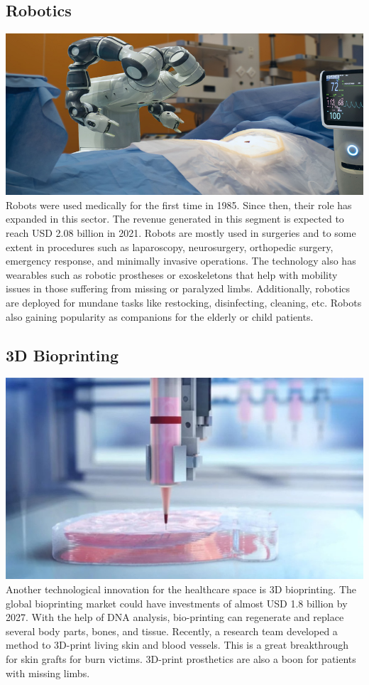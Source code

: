 \documentclass[12pt]{article}
\begin{document}
\subsection*{Robotics}
 \includegraphics[scale=0.2]{rob.jpg}
 \\
Robots were used medically for the first time in 1985. Since then, their role has expanded in this sector. The revenue generated in this segment is expected to reach USD 2.08 billion in 2021. Robots are mostly used in surgeries and to some extent in procedures such as laparoscopy, neurosurgery, orthopedic surgery, emergency response, and minimally invasive operations. The technology also has wearables such as robotic prostheses or exoskeletons that help with mobility issues in those suffering from missing or paralyzed limbs. Additionally, robotics are deployed for mundane tasks like restocking, disinfecting, cleaning, etc. Robots also gaining popularity as companions for the elderly or child patients.
\subsection*{3D Bioprinting}
 \includegraphics[scale=0.15]{print.jpg }
 \\
Another technological innovation for the healthcare space is 3D bioprinting. The global bioprinting market could have investments of almost USD 1.8 billion by 2027. With the help of DNA analysis, bio-printing can regenerate and replace several body parts, bones, and tissue. Recently, a research team developed a method to 3D-print living skin and blood vessels. This is a great breakthrough for skin grafts for burn victims. 3D-print prosthetics are also a boon for patients with missing limbs.
\end{document}
